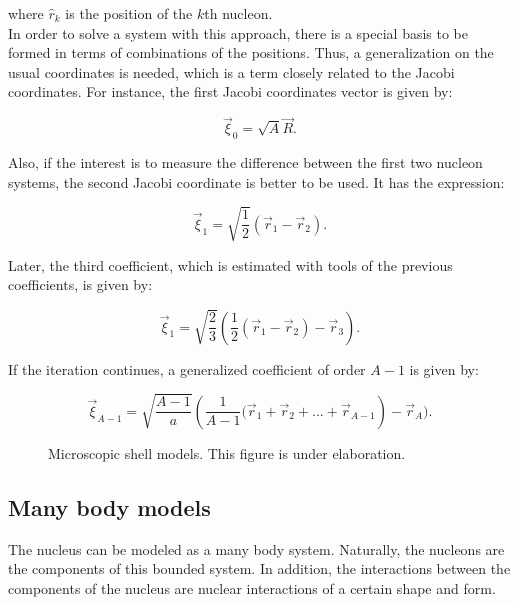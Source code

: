 \documentclass[openany]{book}
\begin{document}
where $\hat r_k$ is the position of the $k$th nucleon. \\

In order to solve a system with this approach, there is a special basis to be formed in terms of combinations of the positions. Thus, a generalization on the usual coordinates is needed, which is a term closely related to the Jacobi coordinates. For instance, the first Jacobi coordinates vector is given by: 

\begin{equation}\label{eq:micro_NCSM_jacobi0}
	\vec \xi_0 = \sqrt{A} \vec R.
\end{equation}

Also, if the interest is to measure the difference between the first two nucleon systems, the second Jacobi coordinate is better to be used. It has the expression: 

\begin{equation}\label{eq:micro_NCSM_jacobi1}
	\vec \xi_1 = \sqrt{\frac{1}{2}} (\vec r_1 - \vec r_2).
\end{equation}

Later, the third coefficient, which is estimated with tools of the previous coefficients, is given by: 

\begin{equation}\label{eq:micro_NCSM_jacobi2}
	\vec \xi_1 = \sqrt{\frac{2}{3}} ( \frac{1}{2}(\vec r_1 - \vec r_2) - \vec r_3).
\end{equation}

If the iteration continues, a generalized coefficient of order $A - 1$ is given by: 

\begin{equation}\label{eq:micro_NCSM_jacobiA-1}
	\vec \xi_{A-1} = \sqrt{\frac{A-1}{a}} \left( \frac{1}{A-1}(\vec r_1 +  \vec r_2 + ... + \vec r_{A - 1} \right) - \vec r_A).
\end{equation}


\begin{figure}[H]
	
	\caption[Microscopic shell models]{Microscopic shell models. This figure is under elaboration.}
	\label{fig:microShellModels}
\end{figure}

\subsection{Many body models}  \label{sub:microscopical_manybody}

The nucleus can be modeled as a many body system. Naturally, the nucleons are the components of this bounded system. In addition, the interactions between the components of the nucleus are nuclear interactions of a certain shape and form.  \\
\end{document}
